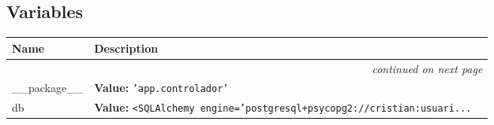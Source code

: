   \subsection{Variables}

    \vspace{-1cm}
\hspace{\varindent}\begin{longtable}{|p{\varnamewidth}|p{\vardescrwidth}|l}
\cline{1-2}
\cline{1-2} \centering \textbf{Name} & \centering \textbf{Description}& \\
\cline{1-2}
\endhead\cline{1-2}\multicolumn{3}{r}{\small\textit{continued on next page}}\\\endfoot\cline{1-2}
\endlastfoot\raggedright \_\-\_\-p\-a\-c\-k\-a\-g\-e\-\_\-\_\- & \raggedright \textbf{Value:} 
{\tt \texttt{'}\texttt{app.controlador}\texttt{'}}&\\
\cline{1-2}
\raggedright d\-b\- & \raggedright \textbf{Value:} 
{\tt {\textless}SQLAlchemy engine='postgresql+psycopg2://cristian:usuari\texttt{...}}&\\
\cline{1-2}
\end{longtable}

